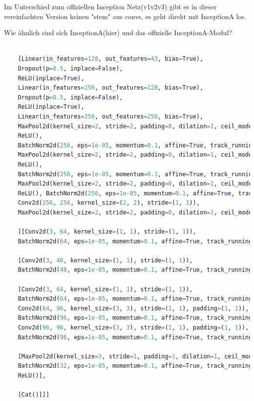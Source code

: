 \documentclass[11pt,a4paper]{article}
\numberwithin{equation}{section}
\begin{document}
	Im Unterschied zum offiziellen Inception Netz(v1v2v3) gibt es in dieser 
	vereinfachten Version keinen "stem" aus convs, 
	es geht direkt mit InceptionA los.
	
	Wie ähnlich sind sich InceptionA(hier) und das offizielle InceptionA-Modul?
	\begin{lstlisting}[language=Python, caption=Reversed Model incv3]
	
	[Linear(in_features=128, out_features=43, bias=True), 
	Dropout(p=0.5, inplace=False), 
	ReLU(inplace=True), 
	Linear(in_features=256, out_features=128, bias=True), 
	Dropout(p=0.5, inplace=False), 
	ReLU(inplace=True), 
	Linear(in_features=256, out_features=256, bias=True), 
	MaxPool2d(kernel_size=2, stride=2, padding=0, dilation=1, ceil_mode=False), 
	ReLU(), 
	BatchNorm2d(256, eps=1e-05, momentum=0.1, affine=True, track_running_stats=True), Conv2d(256, 256, kernel_size=(2, 2), stride=(1, 1)), 
	MaxPool2d(kernel_size=2, stride=2, padding=0, dilation=1, ceil_mode=False), 
	ReLU(), 
	BatchNorm2d(256, eps=1e-05, momentum=0.1, affine=True, track_running_stats=True), Conv2d(256, 256, kernel_size=(2, 2), stride=(1, 1)), 
	MaxPool2d(kernel_size=2, stride=2, padding=0, dilation=1, ceil_mode=False), 
	ReLU(), BatchNorm2d(256, eps=1e-05, momentum=0.1, affine=True, track_running_stats=True), 
	Conv2d(256, 256, kernel_size=(2, 2), stride=(1, 1)), 
	MaxPool2d(kernel_size=2, stride=2, padding=0, dilation=1, ceil_mode=False),
	
	[[Conv2d(3, 64, kernel_size=(1, 1), stride=(1, 1)), 
	BatchNorm2d(64, eps=1e-05, momentum=0.1, affine=True, track_running_stats=True), ReLU()], 
	
	[Conv2d(3, 48, kernel_size=(1, 1), stride=(1, 1)), 
	BatchNorm2d(48, eps=1e-05, momentum=0.1, affine=True, track_running_stats=True), ReLU(), Conv2d(48, 64, kernel_size=(5, 5), stride=(1, 1), padding=(2, 2)), BatchNorm2d(64, eps=1e-05, momentum=0.1, affine=True, track_running_stats=True), ReLU()], 
	
	[Conv2d(3, 64, kernel_size=(1, 1), stride=(1, 1)), 
	BatchNorm2d(64, eps=1e-05, momentum=0.1, affine=True, track_running_stats=True), ReLU(), 
	Conv2d(64, 96, kernel_size=(3, 3), stride=(1, 1), padding=(1, 1)), 
	BatchNorm2d(96, eps=1e-05, momentum=0.1, affine=True, track_running_stats=True), ReLU(), 
	Conv2d(96, 96, kernel_size=(3, 3), stride=(1, 1), padding=(1, 1)), 
	BatchNorm2d(96, eps=1e-05, momentum=0.1, affine=True, track_running_stats=True), ReLU()], 
	
	[MaxPool2d(kernel_size=3, stride=1, padding=1, dilation=1, ceil_mode=False), Conv2d(3, 32, kernel_size=(1, 1), stride=(1, 1)), 
	BatchNorm2d(32, eps=1e-05, momentum=0.1, affine=True, track_running_stats=True), 
	ReLU()], 
	
	[Cat()]]]
	\end{lstlisting}
\end{document}
